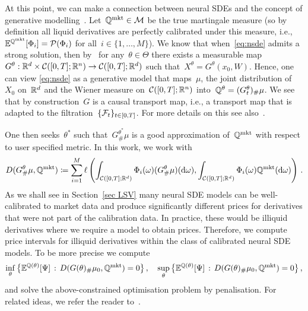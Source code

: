 At this point, we can make a connection between neural SDEs and the concept of generative modelling~\cite{Goodfellow2020GenerativeNetworks, Kingma2013Auto-EncodingBayes}. Let~$\mathbb{Q}^{\textup{mkt}} \in \mathcal{M}$ be the true martingale measure (so by definition all liquid derivatives are perfectly calibrated under this measure, i.e.,~$\mathbb{E}^{\mathbb{Q}^{\textup{mkt}}}[\Phi_i] = \mathcal{P}(\Phi_i)$ for all~$i\in\{1,\ldots, M\}$).
We know that when~\eqref{eq:nsde} admits a strong solution, then by~\cite[Corollary 3.23]{Karatzas2012BrownianCalculus} for any~$\theta \in \Theta$ there exists a measurable map~$G^\theta:\mathbb{R}^d \times \mathcal{C}([0,T]; \mathbb{R}^{n}) \to  \mathcal{C}([0,T];\mathbb{R}^d)$ such that~$X^{\theta} = G^\theta(x_0, W)$. 
Hence, one can view \eqref{eq:nsde} as a generative model that maps~$\mu$, the joint distribution of~$X_0$ on~$\mathbb{R}^d$ and the Wiener measure on~$\mathcal{C}([0,T];\mathbb{R}^n)$ into~$\mathbb{Q}^{\theta} = (G^\theta_t)_{\#}\mu$. 
We see that by construction~$G$ is a causal transport map, i.e., a transport map that is adapted to the filtration~$\{\mathcal{F}_t\}_{t\in [0, T]}$. For more details on this see also~\cite{Acciaio2020CausalOptimization, Lassalle2018CausalProblems}.

One then seeks~$\theta^{\ast}$ such that~$G^{\theta^{\ast}}_{\#}\mu$ is a good approximation of~$\mathbb{Q}^{\textup{mkt}}$ with respect to user specified metric. In this work, we work with 
\[
D(G^\theta_{\#}\mu, \mathbb{Q}^{\textup{mkt}})\coloneqq  \sum_{i=1}^M\ell\left(\int_{\mathcal{C}([0,T];\mathbb{R}^d)} \Phi_{i}(\omega)(G^\theta_{\#}\mu)(\mathrm{d}\omega), \int_{\mathcal{C}([0,T];\mathbb{R}^d)} \Phi_i(\omega) \mathbb{Q}^{\textup{mkt}}(\mathrm{d}\omega) \right)\,.
\] 
As we shall see in Section~\ref{sec LSV} many neural SDE models can be well-calibrated to market data and produce significantly different prices for derivatives that were not part of the calibration data.
In practice, these would be illiquid derivatives where we require a model to obtain prices.
Therefore, we compute price intervals for illiquid derivatives within the class of calibrated neural SDE models. To be more precise we compute 
\[
\inf_{\theta} \big\{ \mathbb{E}^{ \mathbb{Q}(\theta)}[\Psi] \, :\, D(G(\theta)_{\#}\mu_0,\mathbb{Q}^{\textup{mkt}})=0 \big\} \,,\quad
\sup_{\theta} \big\{ \mathbb{E}^{\mathbb{Q}(\theta)}[\Psi] \, :\, D(G(\theta)_{\#}\mu_0,\mathbb{Q}^{\textup{mkt}})=0 \big\}\,,
\]
and solve the above-constrained optimisation problem by penalisation. For related ideas, we refer the reader to~\cite{Eckstein2019ComputationNetworks}.

